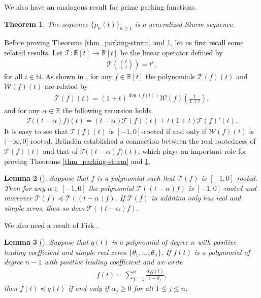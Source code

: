 \documentclass[12pt]{article}
\newtheorem{thm}{Theorem}[section]
\newtheorem{lem}[thm]{Lemma}
\newcommand{\PPP}{\tilde{p}}
\numberwithin{equation}{section}
\begin{document}
We also have an analogous result for prime parking functions. 

\begin{thm}\label{thm_prime-sturm}
The sequence $\{\PPP_{n}(t)\}_{n\geq 1}$ is a generalized Sturm sequence.
\end{thm}

Before proving Theorems \ref{thm_parking-sturm} and \ref{thm_prime-sturm}, let us first recall some related results. 
Let $\mathcal T:\mathbb{R}[t]\rightarrow \mathbb{R}[t]$ be the linear operator defined by
\begin{align*}
\mathcal T\left(\binom{t}{i}\right)=t^i,
\end{align*}
for all $i\in \mathbb{N}$. 
As shown in \cite{Branden-2006},  for any $f\in\mathbb R[t]$ the polynomials $\mathcal{T}(f)(t)$ and $\mathcal{W}(f)(t)$ are related by
\begin{align}\label{relation_TW}
\mathcal T(f)(t)=(1+t)^{\deg(f(t))}\mathcal{W}(f)\left(\frac{t}{1+t}\right),
\end{align}
and for any $\alpha\in\mathbb{R}$ the following recursion holds
\begin{align}\label{eq_T_recursion}
\mathcal{T}\bigl((t-\alpha)f\bigr)(t) = (t-\alpha)\mathcal{T}(f)(t) + t(1+t)\mathcal{T}(f)'(t).
\end{align}
It is easy to see that $\mathcal{T}(f)(t)$ is $[-1,0]$-rooted if and only if $\mathcal{W}(f)(t)$ is $(-\infty,0]$-rooted.
Br\"and\'en \cite{Branden-2006} established a connection between the real-rootedness of $\mathcal{T}(f)(t)$ and that of
$\mathcal{T}\bigl((t-\alpha)f\bigr)(t)$, which plays an important role for proving Theorems \ref{thm_parking-sturm} and \ref{thm_prime-sturm}.

\begin{lem}[{\cite[Lemma 4.4]{Branden-2006}}]\label{lem_Branden}
Suppose that $f$ is a polynomial such that $\mathcal T(f)$ is $[-1,0]$-rooted. 
Then for any $\alpha\in[-1,0]$ the polynomial $\mathcal T((t-\alpha)f)$ is $[-1,0]$-rooted and moreover $\mathcal T(f)\preceq\mathcal T((t-\alpha)f)$. %
If $\mathcal{T}(f)$ in addition only has real and simple zeros, then so does $\mathcal{T}((t-\alpha)f)$.
\end{lem}

We also need a result of Fisk \cite{Fisk-2006}.

\begin{lem}[{\cite[Remark 1.21]{Fisk-2006}}]\label{lem_Fisk}
Suppose that $q(t)$ is a polynomial of degree $n$ with positive leading coefficient and simple real zeros $\{\theta_1,\ldots,\theta_n\}$. 
If $f(t)$ is a polynomial of degree $n-1$ with positive leading coefficient and we write
\begin{align*}
f(t)=\sum_{j=1}^n\frac{\alpha_j q(t)}{t-\theta_j},
\end{align*}
then $f(t)\preceq q(t)$ if and only if $\alpha_j\geq0$ for all $1\leq j\leq n$.
\end{lem}
\end{document}
